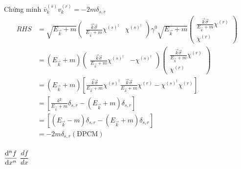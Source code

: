 \documentclass{article}
\begin{document}
Chứng minh $\bar{v}_{k}^{(s)} v^{(r)}_{k} = -2m\delta_{s,r} $
\begin{align*}
	RHS 
	& =
	\sqrt{E_{\vec{k}} + m }
	\begin{pmatrix}
		\frac{\vec{k}\vec{\sigma}}{E_{\vec{k}} + m } \chi^{(s)^{\dagger} } & \chi^{(s)^{\dagger} }
	\end{pmatrix}\gamma^0
	\sqrt{E_{\vec{k}} + m }
	\begin{pmatrix}
		\frac{\vec{k}\vec{\sigma}}{E_{\vec{k}} + m } \chi^{(r)} \\
		\chi^{(r)}
	\end{pmatrix}\\
	&= (E_{\vec{k}}+m)
	\begin{pmatrix}
		\frac{\vec{k}\vec{\sigma}}{E_{\vec{k}} + m } \chi^{(s)^{\dagger} } & -\chi^{(s)^{\dagger} }
	\end{pmatrix}
	\begin{pmatrix}
		\frac{\vec{k}\vec{\sigma}}{E_{\vec{k}} + m } \chi^{(r)} \\
		\chi^{(r)}
	\end{pmatrix}\\
	& = (E_{\vec{k}}+m)
		\left[\frac{\vec{k}\vec{\sigma}}{E_{\vec{k}} + m } \chi^{(s)^{\dagger}}\frac{\vec{k}\vec{\sigma}}{E_{\vec{k}} + m } \chi^{(r)} -\chi^{(s)^{\dagger}} \chi^{(r)}\right] \\
	& = \left[ \frac{k^2}{E_{\vec{k}} + m}\delta_{s,r} - (E_{\vec{k}} + m)\delta_{s,r}\right] \\
	& = \left[ (E_{\vec{k}} - m)\delta_{s,r} - (E_{\vec{k}} + m)\delta_{s,r}\right] \\
	& = -2m \delta_{s,r} (\text{ĐPCM}) \\
\end{align*}

$\displaystyle\dv[n]{f}{x}$
$\dfrac{df}{dx}$
\end{document}
